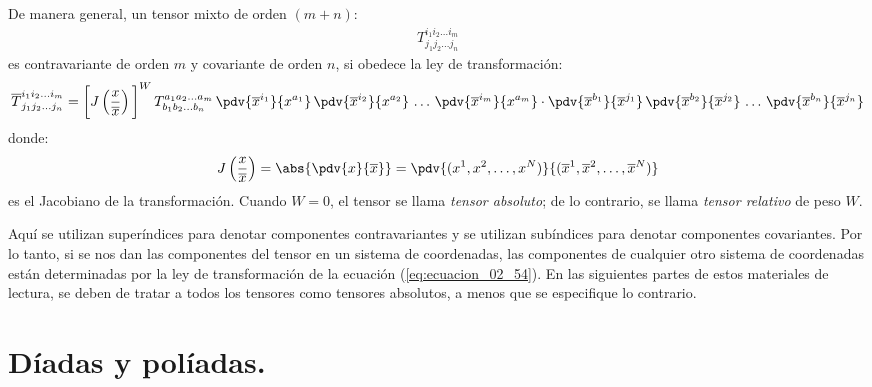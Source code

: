 De manera general, un tensor mixto de orden $(m + n)$:
\begin{align}
T_{j_{1} j_{2} \ldots j_{n}}^{i_{1} i_{2} \ldots i_{m}}
\label{eq:ecuacion_02_53}
\end{align}
es contravariante de orden $m$ y covariante de orden $n$, si obedece la ley de transformación:
\begin{align}
\overline{T}_{j_{1} j_{2} \ldots j_{n}}^{i_{1} i_{2} \ldots i_{m}} = \bigg[ J \left( \dfrac{x}{\overline{x}} \right) \bigg]^{W} \, T_{b_{1} b_{2} \ldots b_{n}}^{a_{1} a_{2} \ldots a_{m}} \, \pdv{\overline{x}^{i_{1}}}{x^{a_{1}}} \, \pdv{\overline{x}^{i_{2}}}{x^{a_{2}}} \, \ldots \, \pdv{\overline{x}^{i_{m}}}{x^{a_{m}}} \cdot \pdv{\overline{x}^{b_{1}}}{\overline{x}^{j_{1}}} \, \pdv{\overline{x}^{b_{2}}}{\overline{x}^{j_{2}}} \, \ldots \, \pdv{\overline{x}^{b_{n}}}{\overline{x}^{j_{n}}}
\label{eq:ecuacion_02_54}
\end{align}
donde:
\begin{align*}
J \left( \dfrac{x}{\overline{x}} \right) = \abs{\pdv{x}{\overline{x}}} = \pdv{(x^{1}, x^{2}, \ldots, x^{N})}{(\overline{x}^{1}, \overline{x}^{2}, \ldots, \overline{x}^{N})}
\end{align*}
es el Jacobiano de la transformación. Cuando $W = 0$, el tensor se llama \emph{tensor absoluto}; de lo contrario, se llama \emph{tensor relativo} de peso $W$.
\par
Aquí se utilizan superíndices para denotar componentes contravariantes y se utilizan subíndices para denotar componentes covariantes. Por lo tanto, si se nos dan las componentes del tensor en un sistema de coordenadas, las componentes de cualquier otro sistema de coordenadas están determinadas por la ley de transformación de la ecuación (\ref{eq:ecuacion_02_54}). En las siguientes partes de estos materiales de lectura, se deben de tratar a todos los tensores como tensores absolutos, a menos que se especifique lo contrario.

\section{Díadas y políadas.}

